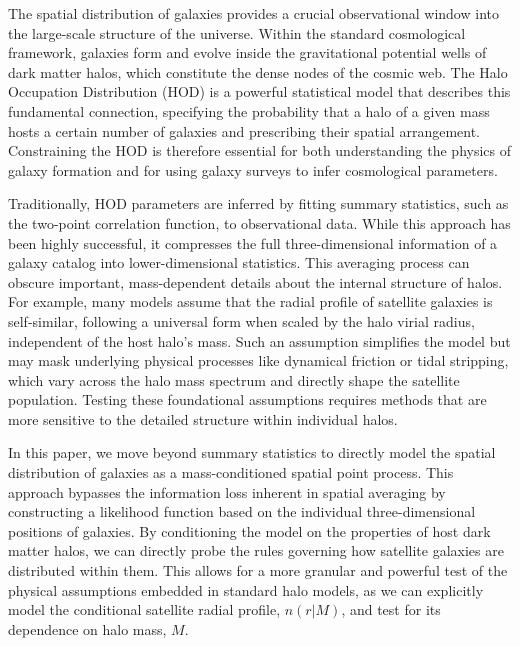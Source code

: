 \documentclass[]{article}
\begin{document}
The spatial distribution of galaxies provides a crucial observational window into the large-scale structure of the universe. Within the standard cosmological framework, galaxies form and evolve inside the gravitational potential wells of dark matter halos, which constitute the dense nodes of the cosmic web. The Halo Occupation Distribution (HOD) is a powerful statistical model that describes this fundamental connection, specifying the probability that a halo of a given mass hosts a certain number of galaxies and prescribing their spatial arrangement. Constraining the HOD is therefore essential for both understanding the physics of galaxy formation and for using galaxy surveys to infer cosmological parameters.

Traditionally, HOD parameters are inferred by fitting summary statistics, such as the two-point correlation function, to observational data. While this approach has been highly successful, it compresses the full three-dimensional information of a galaxy catalog into lower-dimensional statistics. This averaging process can obscure important, mass-dependent details about the internal structure of halos. For example, many models assume that the radial profile of satellite galaxies is self-similar, following a universal form when scaled by the halo virial radius, independent of the host halo's mass. Such an assumption simplifies the model but may mask underlying physical processes like dynamical friction or tidal stripping, which vary across the halo mass spectrum and directly shape the satellite population. Testing these foundational assumptions requires methods that are more sensitive to the detailed structure within individual halos.

In this paper, we move beyond summary statistics to directly model the spatial distribution of galaxies as a mass-conditioned spatial point process. This approach bypasses the information loss inherent in spatial averaging by constructing a likelihood function based on the individual three-dimensional positions of galaxies. By conditioning the model on the properties of host dark matter halos, we can directly probe the rules governing how satellite galaxies are distributed within them. This allows for a more granular and powerful test of the physical assumptions embedded in standard halo models, as we can explicitly model the conditional satellite radial profile, $n(r|M)$, and test for its dependence on halo mass, $M$.
\end{document}
